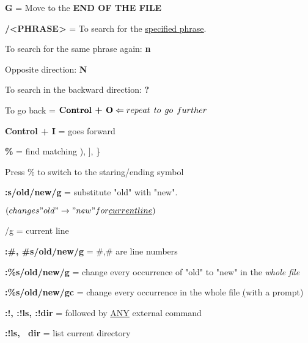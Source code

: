 \documentclass[12pt, letterpaper]{article}
\begin{document}
\begin{flushleft}
\textbf{G} = Move to the \textbf{END OF THE FILE} \\
\par

\textbf{/<PHRASE>} = To search for the \underline{\underline{specified phrase}}. 
\par
To search for the same phrase again: \textbf{n} 
\par
Opposite direction: \textbf{N} \\
\par

To search in the backward direction: \textbf{?} 
\par

To go back = $\textbf{Control + O}  \Leftarrow repeat \hspace{1ex} to \hspace{1ex} go \hspace{1ex} further $

\par

\textbf{Control + I} = goes forward \\
\par

\par

\textbf{\%} = find matching ), ], \} \par
Press \% to switch to the staring/ending symbol \\
\par

\textbf{:s/old/new/g} = substitute "old" with "new". \par
$(changes "old" \rightarrow "new" for \underline{current line})$ \par
/g = current line \\
\par

\textbf{:\#, \#s/old/new/g} = \#,\# are line numbers \\
\par

\textbf{:\%s/old/new/g} = change every occurrence of "old" to "new" in the \textit{whole file} \\
\par

\textbf{:\%s/old/new/gc} = change every occurrence in the whole file \underline(with a prompt) \\
\par

\textbf{:!, :!ls, :!dir} = followed by \underline{ANY} external command \\
\par
\textbf{:!ls, ~dir} = list current directory \\
\par


\end{flushleft}
\end{document}
